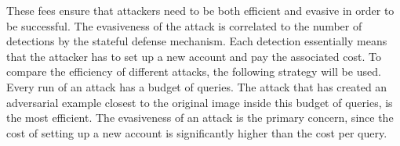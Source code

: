 These fees ensure that attackers need to be both efficient and evasive in order to be successful. The evasiveness of the attack is correlated to the number of detections by the stateful defense mechanism. Each detection essentially means that the attacker has to set up a new account and pay the associated cost. To compare the efficiency of different attacks, the following strategy will be used. Every run of an attack has a budget of queries. The attack that has created an adversarial example closest to the original image inside this budget of queries, is the most efficient. The evasiveness of an attack is the primary concern, since the cost of setting up a new account is significantly higher than the cost per query.

